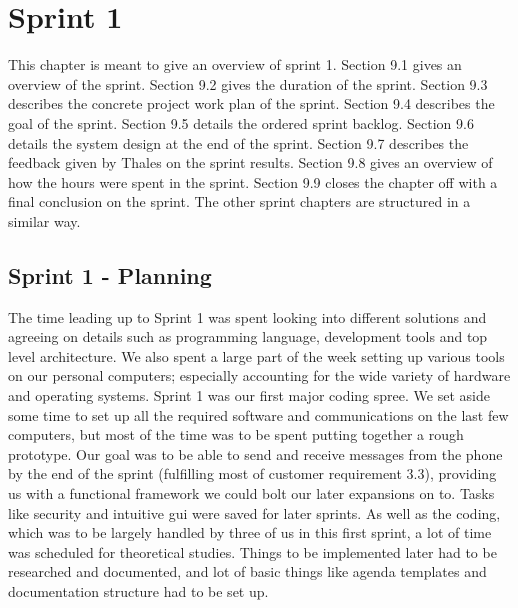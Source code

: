 \chapter{Sprint 1}

This chapter is meant to give an overview of sprint 1. Section 9.1 gives an overview of the sprint. Section 9.2 gives the duration of the sprint. Section 9.3 describes the concrete project work plan of the sprint. Section 9.4 describes the goal of the sprint. Section 9.5 details the ordered sprint backlog. Section 9.6 details the system design at the end of the sprint. Section 9.7 describes the feedback given by Thales on the sprint results. Section 9.8 gives an overview of how the hours were spent in the sprint. Section 9.9 closes the chapter off with a final conclusion on the sprint. The other sprint chapters are structured in a similar way.

\section{Sprint 1 - Planning}
The time leading up to Sprint 1 was spent looking into different solutions and agreeing on details such as programming language, development tools and top level architecture. We also spent a large part of the week setting up various tools on our personal computers; especially accounting for the wide variety of hardware and operating systems.
\newline
\newline
Sprint 1 was our first major coding spree. We set aside some time to set up all the required software and communications on the last few computers, but most of the time was to be spent putting together a rough prototype. Our goal was to be able to send and receive messages from the phone by the end of the sprint (fulfilling most of customer requirement 3.3), providing us with a functional framework we could bolt our later expansions on to. Tasks like security and intuitive \gls{gui} were saved for later sprints.
\newline
\newline
As well as the coding, which was to be largely handled by three of us in this first sprint, a lot of time was scheduled for theoretical studies. Things to be implemented later had to be researched and documented, and lot of basic things like agenda templates and documentation structure had to be set up.